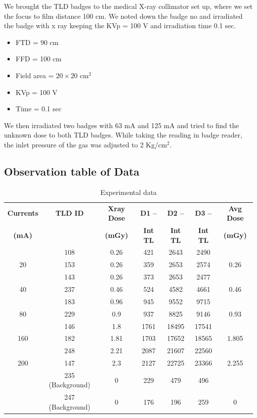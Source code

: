 We brought the TLD badges to the medical X-ray collimator set up, where we set the focus to film distance 100 cm. We noted down the badge no and irradiated the badge with x ray keeping the KVp = 100 V and irradiation time 0.1 sec.

\begin{itemize}
    \item FTD = 90 cm
    \item FFD = 100 cm
    \item Field area = $20 \times 20$ cm$^2$
    \item KVp = 100 V
    \item Time = 0.1 sec
\end{itemize}

We then irradiated two badges with 63 mA and 125 mA and tried to find the unknown dose to both TLD badges. While taking the reading in badge reader, the inlet pressure of the gas was adjusted to 2 Kg/cm$^2$.

\subsection{Observation table of Data}

\begin{table}[H]
    \centering
    \caption{Experimental data}
    \begin{tabular}{|c|c|c|c|c|c|c|}
        \hline
        \textbf{Currents} & \textbf{TLD ID} & \textbf{Xray Dose} & \textbf{D1 --} & \textbf{D2 --} & \textbf{D3 --} & \textbf{Avg Dose} \\
        \textbf{(mA)} & & \textbf{(mGy)} & \textbf{Int TL} & \textbf{Int TL} & \textbf{Int TL} & \textbf{(mGy)} \\
        \hline
        & 108 & 0.26 & 421 & 2643 & 2490 & \\
        20 & 153 & 0.26 & 359 & 2653 & 2574 & 0.26 \\
        & 143 & 0.26 & 373 & 2653 & 2477 & \\
        \hline
        40 & 237 & 0.46 & 524 & 4582 & 4661 & 0.46 \\
        \hline
        & 183 & 0.96 & 945 & 9552 & 9715 & \\
        80 & 229 & 0.9 & 937 & 8825 & 9146 & 0.93 \\
        \hline
        & 146 & 1.8 & 1761 & 18495 & 17541 & \\
        160 & 182 & 1.81 & 1703 & 17652 & 18565 & 1.805 \\
        \hline
        & 248 & 2.21 & 2087 & 21607 & 22560 & \\
        200 & 147 & 2.3 & 2127 & 22725 & 23366 & 2.255 \\
        \hline
        & 235 (Background) & 0 & 229 & 479 & 496 & \\
        & 247 (Background) & 0 & 176 & 196 & 259 & 0 \\
        \hline
    \end{tabular}
\end{table}

